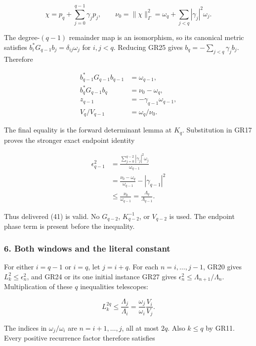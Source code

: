 \[
\chi=p_q+\sum_{j=0}^{q-1}\gamma_jp_j,\qquad
\nu_0=\|\chi\|_\Gamma^2=\omega_q+\sum_{j<q}|\gamma_j|^2\omega_j.
\tag{GR25}
\]

The degree-\((q-1)\) remainder map is an isomorphism, so its canonical metric satisfies \(b_i^*G_{q-1}b_j=\delta_{ij}\omega_j\) for \(i,j<q\). Reducing GR25 gives \(b_q=-\sum_{j<q}\gamma_jb_j\). Therefore

\[
\begin{aligned}
b_{q-1}^*G_{q-1}b_{q-1}&=\omega_{q-1},\\
b_q^*G_{q-1}b_q&=\nu_0-\omega_q,\\
z_{q-1}&=-\gamma_{q-1}\omega_{q-1},\\
V_q/V_{q-1}&=\omega_q/\nu_0.
\end{aligned}
\tag{GR26}
\]

The final equality is the forward determinant lemma at \(K_q\). Substitution in GR17 proves the stronger exact endpoint identity

\[
\begin{aligned}
\epsilon_{q-1}^2
&=\frac{\sum_{j=0}^{q-2}|\gamma_j|^2\omega_j}{\omega_{q-1}}\\
&=\frac{\nu_0-\omega_q}{\omega_{q-1}}-|\gamma_{q-1}|^2\\
&\le\frac{\nu_0}{\omega_{q-1}}
=\frac{\Lambda_q}{\Lambda_{q-1}}.
\end{aligned}
\tag{GR27}
\]

Thus delivered (41) is valid. No \(G_{q-2}\), \(K_{q-2}^{-1}\), or \(V_{q-2}\) is used. The endpoint phase term is present before the inequality.

\subsubsection{6. Both windows and the literal constant}\label{GraphV2:endpoint-gamma_review--both-windows-and-the-literal-constant}

For either \(i=q-1\) or \(i=q\), let \(j=i+q\). For each \(n=i,\ldots,j-1\), GR20 gives \(L_k^2\le\epsilon_n^2\), and GR24 or its one initial instance GR27 gives \(\epsilon_n^2\le\Lambda_{n+1}/\Lambda_n\). Multiplication of these \(q\) inequalities telescopes:

\[
L_k^{2q}\le\frac{\Lambda_j}{\Lambda_i}
=\frac{\omega_j}{\omega_i}\frac{V_i}{V_j}.
\tag{GR28}
\]

The indices in \(\omega_j/\omega_i\) are \(n=i+1,\ldots,j\), all at most \(2q\). Also \(k\le q\) by GR11. Every positive recurrence factor therefore satisfies

